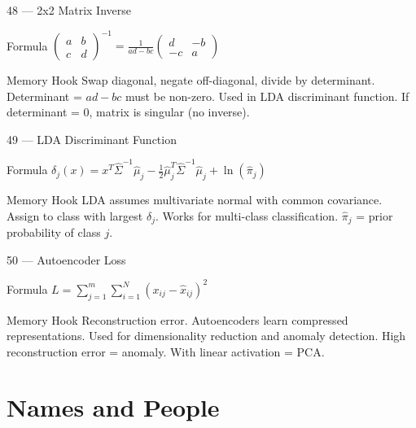 \documentclass[aspectratio=169,8pt]{beamer}
\begin{document}
	\begin{frame}{48 --- 2x2 Matrix Inverse}
		\begin{block}{Formula}
			$\begin{pmatrix} a & b \\ c & d \end{pmatrix}^{-1} = \frac{1}{ad-bc}\begin{pmatrix} d & -b \\ -c & a \end{pmatrix}$
		\end{block}
		\begin{block}{Memory Hook}
			Swap diagonal, negate off-diagonal, divide by determinant. Determinant = $ad-bc$ must be non-zero. Used in LDA discriminant function. If determinant = 0, matrix is singular (no inverse).
		\end{block}
	\end{frame}
	
	\begin{frame}{49 --- LDA Discriminant Function}
		\begin{block}{Formula}
			$\delta_j(x) = x^T\hat{\Sigma}^{-1}\hat{\mu}_j - \frac{1}{2}\hat{\mu}_j^T\hat{\Sigma}^{-1}\hat{\mu}_j + \ln(\hat{\pi}_j)$
		\end{block}
		\begin{block}{Memory Hook}
			LDA assumes multivariate normal with common covariance. Assign to class with largest $\delta_j$. Works for multi-class classification. $\hat{\pi}_j$ = prior probability of class $j$.
		\end{block}
	\end{frame}
	
	\begin{frame}{50 --- Autoencoder Loss}
		\begin{block}{Formula}
			$L = \sum_{j=1}^{m}\sum_{i=1}^{N}(x_{ij} - \hat{x}_{ij})^2$
		\end{block}
		\begin{block}{Memory Hook}
			Reconstruction error. Autoencoders learn compressed representations. Used for dimensionality reduction and anomaly detection. High reconstruction error = anomaly. With linear activation = PCA.
		\end{block}
	\end{frame}
	
	\section{Names and People}
	
\end{document}
